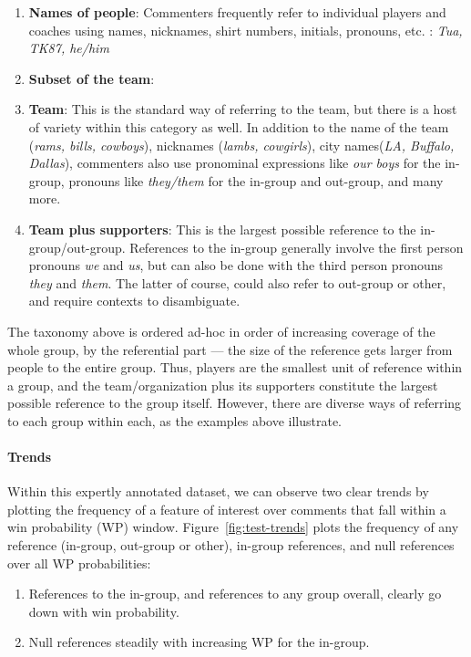 \begin{enumerate}
    \item \textbf{Names of people}: Commenters frequently refer to individual players and coaches using names, nicknames, shirt numbers, initials, pronouns, etc. : \emph{Tua, TK87, he/him\textellipsis}
    \item \textbf{Subset of the team}: 
    \item \textbf{Team}: This is the standard way of referring to the team, but there is a host of variety within this category as well. In addition to the name of the team (\emph{rams, bills, cowboys}), nicknames (\emph{lambs, cowgirls}), city names(\emph{LA, Buffalo, Dallas}), commenters also use pronominal expressions like \emph{our boys} for the in-group, pronouns like \emph{they/them} for the in-group and out-group, and many more.
    \item \textbf{Team plus supporters}: This is the largest possible reference to the in-group/out-group. References to the in-group generally involve the first person pronouns \emph{we} and \emph{us}, but can also be done with the third person pronouns \emph{they} and \emph{them}. The latter of course, could also refer to out-group or other, and require contexts to disambiguate.
\end{enumerate}

The taxonomy above is ordered ad-hoc in order of increasing coverage of the whole group, by the referential part --- the size of the reference gets larger from people to the entire group. Thus, players are the smallest unit of reference within a group, and the team/organization plus its supporters constitute the largest possible reference to the group itself. However, there are diverse ways of referring to each group within each, as the examples above illustrate.

\paragraph{Trends} Within this expertly annotated dataset, we can observe two clear trends by plotting the frequency of a feature of interest over comments that fall within a win probability (WP) window. Figure~\ref{fig:test-trends} plots the frequency of any reference (in-group, out-group or other), in-group references, and null references over all WP probabilities:

\begin{enumerate}
    \item References to the in-group, and references to any group overall, clearly go down with win probability.
    \item Null references steadily with increasing WP for the in-group.
\end{enumerate}

